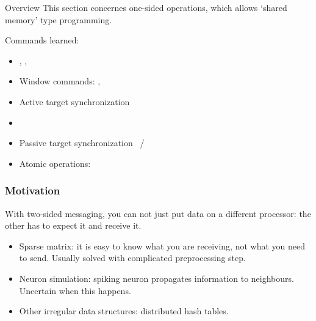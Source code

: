 
\begin{frame}[containsverbatim]{Overview}
  This section concernes one-sided operations, which allows `shared
  memory' type programming.

  Commands learned:
  \begin{itemize}
  \item {}, , 
  \item Window commands: , 
  \item Active target synchronization 
  \item {}
  \item Passive target synchronization ~/
  \item Atomic operations: 
  \end{itemize}
\end{frame}


\begin{frame}[containsverbatim]\frametitle{Motivation}
  With two-sided messaging, you can not just put data
  on a different processor: the other has to expect it and receive it.

  \begin{itemize}
  \item Sparse matrix: it is easy to know what you are receiving, not what you need to send.
    Usually solved with complicated preprocessing step.
  \item Neuron simulation: spiking neuron propagates information to neighbours.
    Uncertain when this happens.
  \item Other irregular data structures: distributed hash tables.
  \end{itemize}
\end{frame}

